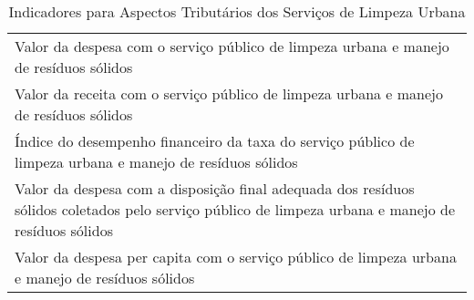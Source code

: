 \begin{table}[htbp]
  \centering
  \caption{ Indicadores para Aspectos Tributários dos Serviços de Limpeza Urbana}
    \begin{tabular}{|p{29em}|}
    \rowcolor[rgb]{ .776,  .878,  .706} \multicolumn{1}{p{29em}}{INDICADORES DOS ASPECTOS TRIBUTÁRIOS DOS SERVIÇOS DE LIMPEZA URBANA} \\
    \midrule
    Valor da despesa com o serviço público de limpeza urbana e manejo de resíduos sólidos \\
    \midrule
    Valor da receita com o serviço público de limpeza urbana e manejo de resíduos sólidos \\
    \midrule
    Índice do desempenho financeiro da taxa do serviço público de limpeza urbana e manejo de resíduos sólidos \\
    \midrule
    Valor da despesa com a disposição final adequada dos resíduos sólidos coletados pelo serviço público de limpeza urbana e manejo de resíduos sólidos \\
    \midrule
    Valor da despesa per capita com o serviço público de limpeza urbana e manejo de  resíduos sólidos \\
    \bottomrule
    \end{tabular}%
  \label{tab:ind_tributo_slu}%
\end{table}%
